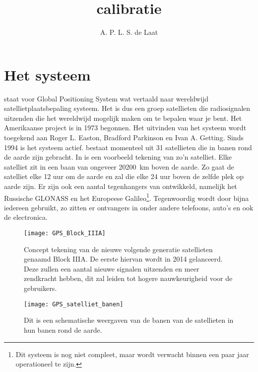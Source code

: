 



\title{\gps calibratie}
\author{A. P. L. S. de Laat}
\date{}

\maketitle

\section{Het \gps systeem}\label{sec:gps_systeem}

\gps staat voor Global Positioning System wat vertaald naar wereldwijd
satellietplaatsbepaling systeem. Het is dus een groep satellieten die
radiosignalen uitzenden die het wereldwijd mogelijk maken om te bepalen
waar je bent. Het Amerikaanse project is in 1973 begonnen. Het uitvinden
van het systeem wordt toegekend aan Roger L. Easton, Bradford Parkinson
en Ivan A. Getting. Sinds 1994 is het systeem actief. \gps bestaat
momenteel uit 31 satellieten die in banen rond de aarde zijn gebracht.
In  is een voorbeeld tekening van zo'n \gps
satelliet. Elke \gps satelliet zit in een baan van ongeveer
\SI{20200}{\kilo\meter} boven de aarde. Zo gaat de satelliet elke 12 uur
om de aarde en zal die elke 24 uur boven de zelfde plek op aarde zijn.
Er zijn ook een aantal tegenhangers van \gps ontwikkeld, namelijk het
Russische GLONASS en het Europeese Galileo\footnote{Dit systeem is nog
niet compleet, maar wordt verwacht binnen een paar jaar operationeel te
zijn.}. Tegenwoordig wordt \gps door bijna iedereen gebruikt, zo zitten
er \gps ontvangers in onder andere telefoons, auto's en ook de \hisparc
electronica.

\begin{figure}
    \centering
    \texttt{[image: GPS\_Block\_IIIA]}
    \caption{Concept tekening van de nieuwe volgende generatie \gps
    satellieten genaamd \gps Block IIIA. De eerste hiervan wordt in 2014
    gelanceerd. Deze zullen een aantal nieuwe signalen uitzenden en meer
    zendkracht hebben, dit zal leiden tot hogere nauwkeurigheid voor de
    gebruikers.}
    \label{fig:GPSBlockIIIA}
\end{figure}

\begin{figure}
    \centering
    \texttt{[image: GPS\_satelliet\_banen]}
    \caption{Dit is een schematische weergaven van de banen van de \gps
    satellieten in hun banen rond de aarde.}
    \label{fig:GPS_satelliet_banen}
\end{figure}


